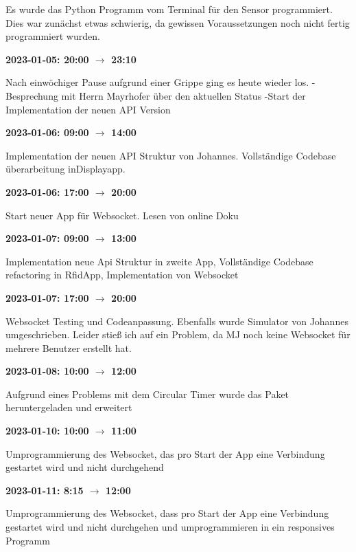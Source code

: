 Es wurde das Python
Programm vom Terminal für den Sensor programmiert. Dies war zun\"achst
etwas schwierig, da gewissen Voraussetzungen noch nicht fertig
programmiert wurden.

\vspace{0.5cm} \textbf{2023-01-05: 20:00 $\rightarrow$ 23:10} 

Nach einwöchiger Pause aufgrund einer Grippe ging es heute wieder los. -Besprechung mit Herrn Mayrhofer über den aktuellen Status -Start der Implementation der neuen
API Version

\vspace{0.5cm} \textbf{2023-01-06: 09:00 $\rightarrow$ 14:00} 

Implementation der neuen API Struktur von Johannes. Vollständige Codebase überarbeitung inDisplayapp.

\vspace{0.5cm} \textbf{2023-01-06: 17:00 $\rightarrow$ 20:00} 

Start neuer App für Websocket. Lesen von online Doku

\vspace{0.5cm} \textbf{2023-01-07: 09:00 $\rightarrow$ 13:00} 

Implementation neue Api Struktur in zweite App, Vollständige Codebase refactoring in RfidApp, Implementation von Websocket

\vspace{0.5cm} \textbf{2023-01-07: 17:00 $\rightarrow$ 20:00} 

Websocket Testing und Codeanpassung. Ebenfalls wurde Simulator von Johannes umgeschrieben. Leider stieß ich auf ein Problem, da MJ noch keine Websocket f\"ur mehrere Benutzer erstellt hat.

\vspace{0.5cm} \textbf{2023-01-08: 10:00 $\rightarrow$ 12:00} 

Aufgrund eines Problems mit dem Circular Timer wurde das Paket heruntergeladen und erweitert

\vspace{0.5cm} \textbf{2023-01-10: 10:00 $\rightarrow$ 11:00} 

Umprogrammierung des Websocket, das pro Start der App eine Verbindung gestartet wird und nicht durchgehend

\vspace{0.5cm} \textbf{2023-01-11: 8:15 $\rightarrow$ 12:00} 

Umprogrammierung des Websocket, dass pro Start der App eine Verbindung gestartet wird und nicht durchgehen und umprogrammieren in ein responsives Programm

